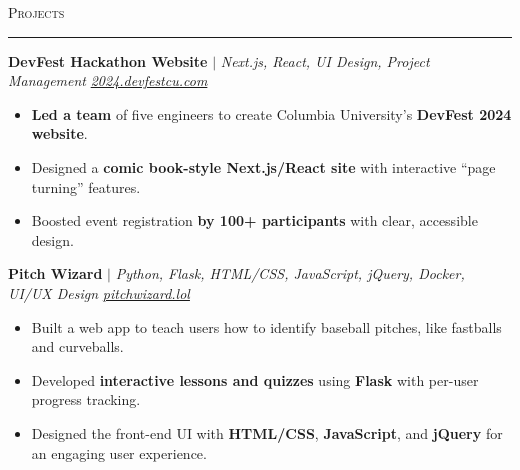 \documentclass[11pt,letterpaper]{article}
\begin{document}

\vspace{4pt}
\textsc{\large{Projects}} 
\vspace{4pt}
\hrule
\begin{list}{}{\setlength{\leftmargin}{1em}\setlength{\rightmargin}{2pt}}
  
    \item
        \small{\textbf{DevFest Hackathon Website}} $|$ \small{\textit{Next.js, React, UI Design, Project Management}} \hfill \small{\textit{\href{https://2024.devfestcu.com/}{2024.devfestcu.com}}}
          \begin{itemize}[itemsep=-5pt, topsep=-2pt]
              \item \textbf{Led a team} of five engineers to create Columbia University's \textbf{DevFest 2024 website}.
              \item Designed a \textbf{comic book-style Next.js/React site} with interactive ``page turning'' features.
              \item Boosted event registration \textbf{by 100+ participants} with clear, accessible design.
          \end{itemize}
          \vspace{4pt}

    \item
        \small{\textbf{Pitch Wizard}} $|$ \small{\textit{Python, Flask, HTML/CSS, JavaScript, jQuery, Docker, UI/UX Design}} \hfill \small{\textit{\href{https://pitchwizard.lol/}{pitchwizard.lol}}}
          \begin{itemize}[itemsep=-5pt, topsep=-2pt]
              \item Built a web app to teach users how to identify baseball pitches, like fastballs and curveballs.
              \item Developed \textbf{interactive lessons and quizzes} using \textbf{Flask} with per-user progress tracking.
              \item Designed the front-end UI with \textbf{HTML/CSS}, \textbf{JavaScript}, and \textbf{jQuery} for an engaging user experience.
          \end{itemize}
          \vspace{4pt}
    

\end{list}
\end{document}
